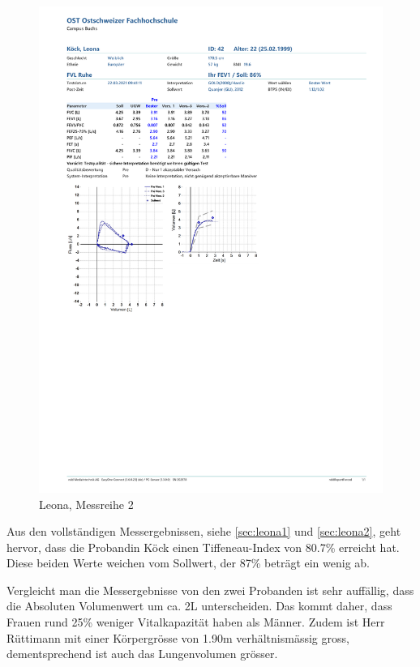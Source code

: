 \documentclass[11pt]{scrartcl}
\begin{document}
        \begin{figure}[H]
        \centering
        \includegraphics[clip, trim=1cm 10cm 0cm 10.6cm, width=15cm]{Dateien/Leona2.pdf}
        \caption{Leona, Messreihe 2}
        \end{figure}


    Aus den vollständigen Messergebnissen, siehe \autoref{sec:leona1} und \autoref{sec:leona2}, geht hervor, dass die
    Probandin Köck einen Tiffeneau-Index von 80.7\% erreicht hat.
    Diese beiden Werte weichen vom Sollwert, der 87\% beträgt ein wenig ab.

    Vergleicht man die Messergebnisse von den zwei Probanden ist sehr auffällig, dass die Absoluten Volumenwert um ca. 2L unterscheiden.
    Das kommt daher, dass Frauen rund 25\% weniger Vitalkapazität haben als Männer.
    Zudem ist Herr Rüttimann mit einer Körpergrösse von 1.90m verhältnismässig gross, dementsprechend ist auch das
    Lungenvolumen grösser.
\end{document}
